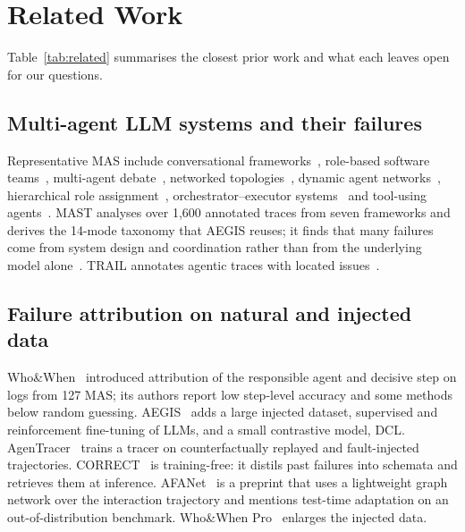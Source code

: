 \documentclass[conference]{IEEEtran}
\begin{document}
\section{Related Work}
Table~\ref{tab:related} summarises the closest prior work and what each leaves open for our questions.

\subsection{Multi-agent LLM systems and their failures}
Representative MAS include conversational frameworks~\cite{wu}, role-based software teams~\cite{hong}, multi-agent debate~\cite{du}, networked topologies~\cite{qian}, dynamic agent networks~\cite{dylan}, hierarchical role assignment~\cite{agentverse}, orchestrator--executor systems~\cite{magentic} and tool-using agents~\cite{smol}. MAST analyses over 1,600 annotated traces from seven frameworks and derives the 14-mode taxonomy that AEGIS reuses; it finds that many failures come from system design and coordination rather than from the underlying model alone~\cite{mast}. TRAIL annotates agentic traces with located issues~\cite{trail}.

\subsection{Failure attribution on natural and injected data}
Who\&When~\cite{whowhen} introduced attribution of the responsible agent and decisive step on logs from 127 MAS; its authors report low step-level accuracy and some methods below random guessing. AEGIS~\cite{aegis} adds a large injected dataset, supervised and reinforcement fine-tuning of LLMs, and a small contrastive model, DCL. AgenTracer~\cite{agentracer} trains a tracer on counterfactually replayed and fault-injected trajectories. CORRECT~\cite{correct} is training-free: it distils past failures into schemata and retrieves them at inference. AFANet~\cite{afanet} is a preprint that uses a lightweight graph network over the interaction trajectory and mentions test-time adaptation on an out-of-distribution benchmark. Who\&When Pro~\cite{whenpro} enlarges the injected data.
\end{document}

